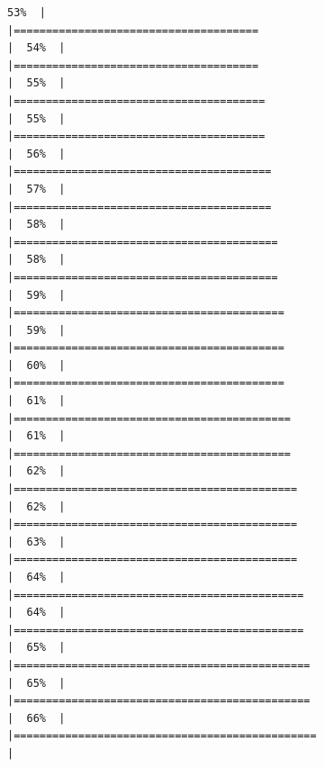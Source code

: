 \documentclass[
  english,
  man,a4paper,mask,floatsintext]{apa6}
\begin{document}
\begin{verbatim}
53%  |                                                                              |======================================                                |  54%  |                                                                              |======================================                                |  55%  |                                                                              |=======================================                               |  55%  |                                                                              |=======================================                               |  56%  |                                                                              |========================================                              |  57%  |                                                                              |========================================                              |  58%  |                                                                              |=========================================                             |  58%  |                                                                              |=========================================                             |  59%  |                                                                              |==========================================                            |  59%  |                                                                              |==========================================                            |  60%  |                                                                              |==========================================                            |  61%  |                                                                              |===========================================                           |  61%  |                                                                              |===========================================                           |  62%  |                                                                              |============================================                          |  62%  |                                                                              |============================================                          |  63%  |                                                                              |============================================                          |  64%  |                                                                              |=============================================                         |  64%  |                                                                              |=============================================                         |  65%  |                                                                              |==============================================                        |  65%  |                                                                              |==============================================                        |  66%  |                                                                              |===============================================                       |  
\end{verbatim}
\end{document}
